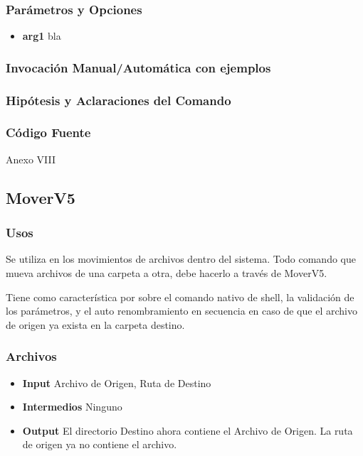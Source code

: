\documentclass[a4paper,10pt,titlepage]{article}
\begin{document}
		\subsubsection{Par\'ametros y Opciones}
			\begin {itemize}
				\item \textbf{arg1} {bla}
			\end{itemize}
	
		\subsubsection{Invocaci\'on Manual/Autom\'atica con ejemplos}

		\subsubsection{Hip\'otesis y Aclaraciones del Comando}

		\subsubsection{C\'odigo Fuente}
			Anexo VIII


	\subsection{MoverV5}
		\subsubsection{Usos}
			Se utiliza en los movimientos de archivos dentro del sistema. Todo comando que mueva archivos de una carpeta a otra, debe hacerlo a trav\'es de MoverV5.

			Tiene como caracter\'istica por sobre el comando nativo de shell, la validaci\'on de los par\'ametros, y el auto renombramiento en secuencia en caso de que el archivo de origen ya exista en la carpeta destino.

		\subsubsection{Archivos}
			\begin {itemize}
				\item \textbf{Input } {Archivo de Origen, Ruta de Destino}
				\item \textbf{Intermedios } {Ninguno}
				\item \textbf{Output } {El directorio Destino ahora contiene el Archivo de Origen. La ruta de origen ya no contiene el archivo.}
			\end{itemize}
\end{document}
